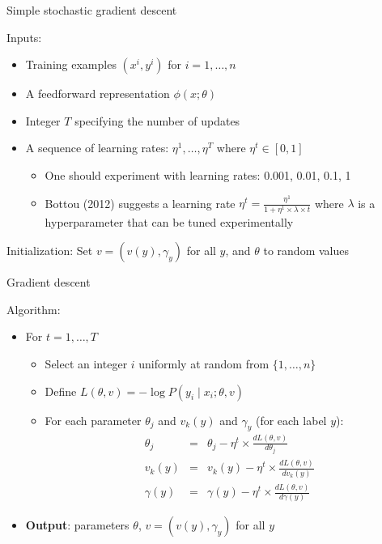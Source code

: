 \begin{frame}{Simple stochastic gradient descent}
\begin{block}{Inputs:}
\begin{itemize}[<+->]
\item Training examples $(x^i, y^i)$ for $i = 1, \ldots, n$
\item A feedforward representation $\phi(x; \theta)$
\item Integer $T$ specifying the number of updates
\item A sequence of learning rates: $\eta^1, \ldots, \eta^T$ where $\eta^t \in [0,1]$
\begin{itemize}[<+->]
\item One should experiment with learning rates: 0.001, 0.01, 0.1, 1
\item Bottou (2012) suggests a learning rate $\eta^t = \frac{\eta^1}{1 + \eta^1 \times \lambda \times t}$ where $\lambda$ is a hyperparameter that can be tuned experimentally
\end{itemize}
\end{itemize}
\end{block}
\pause
\begin{block}{Initialization:}
Set $v = (v(y), \gamma_y)$ for all $y$, and $\theta$ to random values
\end{block}
\end{frame}



\begin{frame}{Gradient descent}
\begin{block}{Algorithm:}
\begin{itemize}[<+->]
\item For $t = 1, \ldots, T$
\begin{itemize}[<+->]
\item Select an integer $i$ uniformly at random from $\{ 1, \ldots, n \}$
\item Define $L(\theta, v) = - \log P(y_i \mid x_i; \theta, v)$
\item For each parameter $\theta_j$ and $v_k(y)$ and $\gamma_y$ (for each label $y$):
\begin{eqnarray*}
\theta_j &=& \theta_j - \eta^t \times \frac{dL(\theta,v)}{d\theta_j} \\
v_k(y) &=& v_k(y) - \eta^t \times \frac{dL(\theta,v)}{d v_k(y)} \\
\gamma(y) &=& \gamma(y) - \eta^t \times \frac{dL(\theta,v)}{d \gamma(y)}
\end{eqnarray*}
\end{itemize}
\item \textbf{Output}: parameters $\theta$, $v = (v(y), \gamma_y)$ for all $y$
\end{itemize}
\end{block}
\end{frame}


